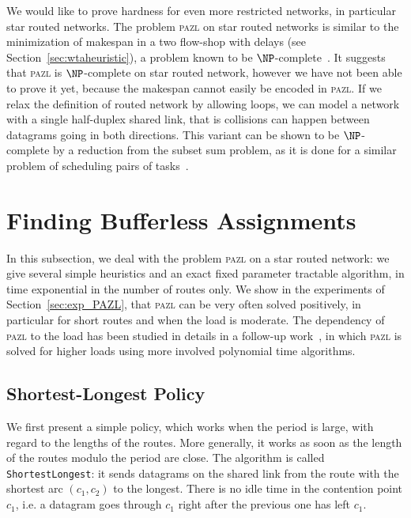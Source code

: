 \documentclass[a4paper,10pt]{journal}
\newcommand\shortestlongest{\texttt{ShortestLongest}\xspace}
\newcommand\pazl{\textsc{pazl}\xspace}
\begin{document}
	We would like to prove hardness for even more restricted networks, in particular star routed networks.
   The problem \pazl on star routed networks is similar to the minimization of makespan in a two flow-shop with delays (see Section~\ref{sec:wtaheuristic}), a problem known to be $\NP$-complete~\cite{yu2004minimizing}. It suggests that \pazl is $\NP$-complete on star routed network, however we have not been able to prove it yet,  because the makespan cannot easily be encoded in \pazl. If we relax the definition of routed network by allowing loops,  we can model a network with a single half-duplex shared link, that is collisions can happen between datagrams going in both directions. This variant can be shown to be $\NP$-complete by a reduction from the subset sum problem, as it is done for a similar problem of scheduling pairs of tasks~\cite{orman1997complexity}.
  

\section{Finding Bufferless Assignments} \label{sec:PAZL}
  
  In this subsection, we deal with the problem \pazl on a star routed network: 
  we give several simple heuristics and an exact fixed parameter tractable algorithm, in time exponential in the number of routes only. We show in the experiments of Section~\ref{sec:exp_PAZL}, that \pazl can be very often solved positively, in particular for short routes and when the load is moderate. The dependency of \pazl to the load has been studied in details in a follow-up work~\cite{guiraud2020scheduling}, in which \pazl is solved for higher loads using more involved polynomial time algorithms. 
  
	\subsection{Shortest-Longest Policy}
    

    We first present a simple policy, which works when the period is large, with regard to the lengths of the routes. More generally, it works as soon as the length of the routes modulo the period are close. The algorithm is called \shortestlongest: it sends datagrams on the shared link from the route with the shortest arc $(c_1,c_2)$ to the longest. There is no idle time in the contention point $c_1$, i.e. a datagram goes through $c_1$ right after the previous one has left $c_1$.
      
\end{document}

